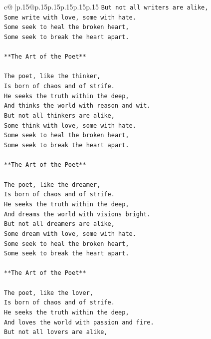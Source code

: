 \documentclass{article}
\begin{document}
{\begin{supertabular}{c@{$\;$}|p{.15\linewidth}@{}p{.15\linewidth}p{.15\linewidth}p{.15\linewidth}p{.15\linewidth}p{.15\linewidth}}
{{{\texttt{But not all writers are alike,} \\
\texttt{Some write with love, some with hate.} \\
\texttt{Some seek to heal the broken heart,} \\
\texttt{Some seek to break the heart apart.} \\
\\ 
\texttt{**The Art of the Poet**} \\
\\ 
\texttt{The poet, like the thinker,} \\
\texttt{Is born of chaos and of strife.} \\
\texttt{He seeks the truth within the deep,} \\
\texttt{And thinks the world with reason and wit.} \\
\texttt{But not all thinkers are alike,} \\
\texttt{Some think with love, some with hate.} \\
\texttt{Some seek to heal the broken heart,} \\
\texttt{Some seek to break the heart apart.} \\
\\ 
\texttt{**The Art of the Poet**} \\
\\ 
\texttt{The poet, like the dreamer,} \\
\texttt{Is born of chaos and of strife.} \\
\texttt{He seeks the truth within the deep,} \\
\texttt{And dreams the world with visions bright.} \\
\texttt{But not all dreamers are alike,} \\
\texttt{Some dream with love, some with hate.} \\
\texttt{Some seek to heal the broken heart,} \\
\texttt{Some seek to break the heart apart.} \\
\\ 
\texttt{**The Art of the Poet**} \\
\\ 
\texttt{The poet, like the lover,} \\
\texttt{Is born of chaos and of strife.} \\
\texttt{He seeks the truth within the deep,} \\
\texttt{And loves the world with passion and fire.} \\
\texttt{But not all lovers are alike,} \\
}}}
\end{supertabular}}
\end{document}
